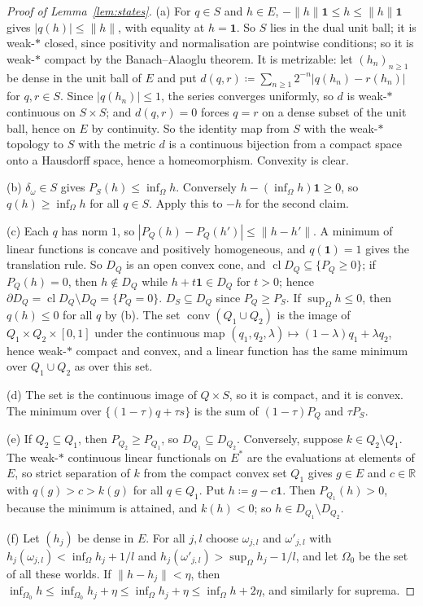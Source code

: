 \documentclass[11pt]{article}
\newcommand{\R}{\mathbb{R}}
\newcommand{\one}{\mathbf{1}}
\DeclareMathOperator{\conv}{conv}
\DeclareMathOperator{\cl}{cl}
\theoremstyle{plain}
\theoremstyle{definition}
\theoremstyle{remark}
\begin{document}
\begin{proof}[Proof of Lemma~\ref{lem:states}]
(a) For $q\in S$ and $h\in E$, $-\|h\|\one\le h\le\|h\|\one$ gives $|q(h)|\le\|h\|$, with
equality at $h=\one$. So $S$ lies in the dual unit ball; it is weak-$\ast$ closed, since
positivity and normalisation are pointwise conditions; so it is weak-$\ast$ compact by the
Banach--Alaoglu theorem. It is metrizable: let $(h_n)_{n\ge1}$ be dense in the unit ball of $E$ and
put $d(q,r)\coloneqq\sum_{n\ge1}2^{-n}|q(h_n)-r(h_n)|$ for $q,r\in S$. Since $|q(h_n)|\le1$, the
series converges uniformly, so $d$ is weak-$\ast$ continuous on $S\times S$; and $d(q,r)=0$ forces
$q=r$ on a dense subset of the unit ball, hence on $E$ by continuity. So the identity map from $S$
with the weak-$\ast$ topology to $S$ with the metric $d$ is a continuous bijection from a compact
space onto a Hausdorff space, hence a homeomorphism. Convexity is clear.

(b) $\delta_\omega\in S$ gives $P_S(h)\le\inf_\Omega h$. Conversely $h-(\inf_\Omega h)\one\ge0$,
so $q(h)\ge\inf_\Omega h$ for all $q\in S$. Apply this to $-h$ for the second claim.

(c) Each $q$ has norm $1$, so $|P_Q(h)-P_Q(h')|\le\|h-h'\|$. A minimum of linear functions is
concave and positively homogeneous, and $q(\one)=1$ gives the translation rule. So $D_Q$ is an
open convex cone, and $\cl D_Q\subseteq\{P_Q\ge0\}$; if $P_Q(h)=0$, then $h\notin D_Q$ while
$h+t\one\in D_Q$ for $t>0$; hence $\partial D_Q=\cl D_Q\setminus D_Q=\{P_Q=0\}$. $D_S\subseteq
D_Q$ since $P_Q\ge P_S$. If $\sup_\Omega h\le0$, then $q(h)\le0$ for all $q$ by (b). The set
$\conv(Q_1\cup Q_2)$ is the image of $Q_1\times Q_2\times[0,1]$ under the continuous map
$(q_1,q_2,\lambda)\mapsto(1-\lambda)q_1+\lambda q_2$, hence weak-$\ast$ compact and convex, and a
linear function has the same minimum over $Q_1\cup Q_2$ as over this set.

(d) The set is the continuous image of $Q\times S$, so it is compact, and it is convex. The
minimum over $\{(1-\tau)q+\tau s\}$ is the sum of $(1-\tau)P_Q$ and $\tau P_S$.

(e) If $Q_2\subseteq Q_1$, then $P_{Q_2}\ge P_{Q_1}$, so $D_{Q_1}\subseteq D_{Q_2}$. Conversely,
suppose $k\in Q_2\setminus Q_1$. The weak-$\ast$ continuous linear functionals on $E^\ast$ are
the evaluations at elements of $E$, so strict separation of $k$ from the compact convex set
$Q_1$ gives $g\in E$ and $c\in\R$ with $q(g)>c>k(g)$ for all $q\in Q_1$. Put $h\coloneqq
g-c\one$. Then $P_{Q_1}(h)>0$, because the minimum is attained, and $k(h)<0$; so $h\in D_{Q_1}
\setminus D_{Q_2}$.

(f) Let $(h_j)$ be dense in $E$. For all $j,l$ choose $\omega_{j,l}$ and $\omega'_{j,l}$ with
$h_j(\omega_{j,l})<\inf_\Omega h_j+1/l$ and $h_j(\omega'_{j,l})>\sup_\Omega h_j-1/l$, and let
$\Omega_0$ be the set of all these worlds. If $\|h-h_j\|<\eta$, then $\inf_{\Omega_0}h\le
\inf_{\Omega_0}h_j+\eta\le\inf_\Omega h_j+\eta\le\inf_\Omega h+2\eta$, and similarly for
suprema.
\end{proof}
\end{document}
